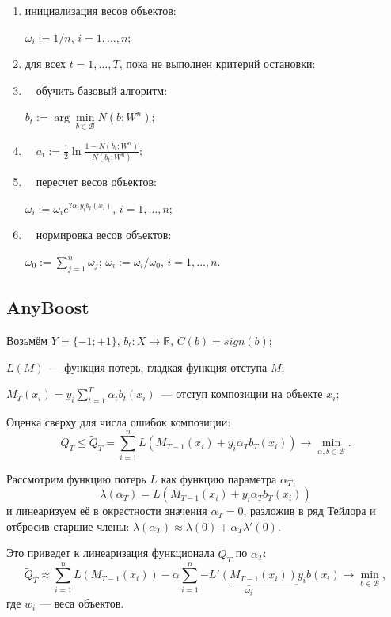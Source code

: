 \documentclass{article}
\renewcommand{\leq}{\leqslant}
\theoremstyle{definition}
\theoremstyle{theorem}
\theoremstyle{remark}
\theoremstyle{theorem}
\theoremstyle{example}
\theoremstyle{theorem}
\theoremstyle{theorem}
\theoremstyle{theorem}
\theoremstyle{theorem}
\begin{document}
\begin{enumerate}
	\item инициализация весов объектов: 
	
	$\omega_i := 1/n$, $i = 1, \ldots, n$;
	\item для всех $t=1,\ldots,T$, пока не выполнен критерий остановки:
	\item   $\quad$обучить базовый алгоритм: 
	
	$b_t := \arg \min \limits_{b \in \mathcal{B}} N(b; W^n)$;
	\item   $\quad a_t := \frac{1}{2} \ln \frac{1-N(b_t; W^n)}{N(b_t; W^n)}$;
	\item   $\quad$пересчет весов объектов: 
	
	$\omega_i := \omega_i e^{?\alpha_t y_i b_t(x_i)}$, $i = 1, \ldots, n$;
	\item   $\quad$нормировка весов объектов: 
	
	$\omega_0 := \sum_{j=1}^{n} \omega_j$; $\omega_i:=\omega_i/\omega_0$, $i = 1, \ldots, n$.
\end{enumerate}

\subsection{AnyBoost}

Возьмём $Y = \{-1;+1\}$, $b_t: X \to \mathbb{R}$, $C(b) = sign(b)$;

$L(M)$~--- функция потерь, гладкая функция отступа $M$;
\vspace{0.2cm}

$M_T(x_i) = y_i \sum_{t=1}^{T} \alpha_t b_t(x_i)$~--- отступ композиции на объекте $x_i$;
\vspace{0.2cm}

Оценка сверху для числа ошибок композиции:
$$Q_T \leq \widetilde {Q}_T =\sum_{i=1}^{n} L(M_{T-1}(x_i) + y_i \alpha_T b_T(x_i)) \to \min \limits_{\alpha, b \in \mathcal{B}}.$$

Рассмотрим функцию потерь $L$ как функцию параметра $\alpha_T$,
$$\lambda(\alpha_T) = L(M_{T-1}(x_i) + y_i \alpha_T b_T(x_i))$$
и линеаризуем её в окрестности значения  $\alpha_T = 0$, разложив в ряд Тейлора и отбросив старшие члены: $\lambda(\alpha_T) \approx \lambda(0) + \alpha_T \lambda'(0)$.

Это приведет к линеаризация функционала $\widetilde {Q}_T$ по $\alpha_T$:
$$\widetilde {Q}_T \approx \sum_{i=1}^{n} L (M_{T-1}(x_i)) - \alpha \sum_{i=1}^{n} \underbrace{ - L' (M_{T-1}(x_i))}_{\omega_i} y_i b(x_i) \to \min \limits_{b \in \mathcal{B}},$$
где $w_i$ — веса объектов.
\end{document}
